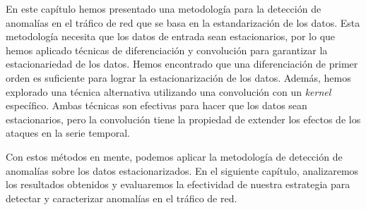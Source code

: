 En este capítulo hemos presentado una metodología para la detección de anomalías en el tráfico de red que se basa en la estandarización de los datos. Esta metodología necesita que los datos de entrada sean estacionarios, por lo que hemos aplicado técnicas de diferenciación y convolución para garantizar la estacionariedad de los datos. Hemos encontrado que una diferenciación de primer orden es suficiente para lograr la estacionarización de los datos. Además, hemos explorado una técnica alternativa utilizando una convolución con un \textit{kernel} específico. Ambas técnicas son efectivas para hacer que los datos sean estacionarios, pero la convolución tiene la propiedad de extender los efectos de los ataques en la serie temporal.

Con estos métodos en mente, podemos aplicar la metodología de detección de anomalías sobre los datos estacionarizados. En el siguiente capítulo, analizaremos los resultados obtenidos y evaluaremos la efectividad de nuestra estrategia para detectar y caracterizar anomalías en el tráfico de red.